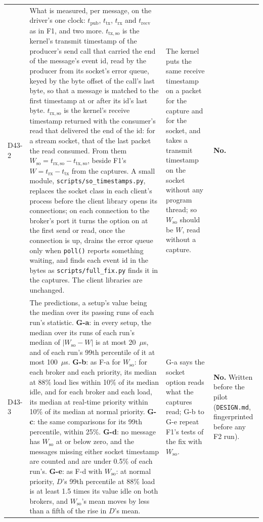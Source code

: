 \documentclass[11pt]{article}
\begin{document}
{\begin{longtable}{@{}p{1.1cm} >{\raggedright\arraybackslash}p{6.1cm} >{\raggedright\arraybackslash}p{6.0cm} >{\raggedright\arraybackslash}p{2.2cm}@{}}
D43-2 & What is measured, per message, on the driver's one clock: $t_{\mathrm{pub}}$, $t_{\mathrm{tx}}$, $t_{\mathrm{rx}}$ and $t_{\mathrm{recv}}$ as in F1, and two more. $t_{\mathrm{tx,so}}$ is the kernel's transmit timestamp of the producer's send call that carried the end of the message's event id, read by the producer from its socket's error queue, keyed by the byte offset of the call's last byte, so that a message is matched to the first timestamp at or after its id's last byte. $t_{\mathrm{rx,so}}$ is the kernel's receive timestamp returned with the consumer's read that delivered the end of the id: for a stream socket, that of the last packet the read consumed. From them $W_{\mathrm{so}} = t_{\mathrm{rx,so}} - t_{\mathrm{tx,so}}$, beside F1's $W = t_{\mathrm{rx}} - t_{\mathrm{tx}}$ from the captures. A small module, \texttt{scripts/so\_timestamps.py}, replaces the socket class in each client's process before the client library opens its connections; on each connection to the broker's port it turns the option on at the first send or read, once the connection is up, drains the error queue only when \texttt{poll()} reports something waiting, and finds each event id in the bytes as \texttt{scripts/full\_fix.py} finds it in the captures. The client libraries are unchanged. & The kernel puts the same receive timestamp on a packet for the capture and for the socket, and takes a transmit timestamp on the socket without any program thread; so $W_{\mathrm{so}}$ should be $W$, read without a capture. & \textbf{No.} \\
D43-3 & The predictions, a setup's value being the median over its passing runs of each run's statistic. \textbf{G-a}: in every setup, the median over its runs of each run's median of $|W_{\mathrm{so}} - W|$ is at most 20~$\mu$s, and of each run's 99th percentile of it at most 100~$\mu$s. \textbf{G-b}: as F-a for $W_{\mathrm{so}}$: for each broker and each priority, its median at 88\% load lies within 10\% of its median idle, and for each broker and each load, its median at real-time priority within 10\% of its median at normal priority. \textbf{G-c}: the same comparisons for its 99th percentile, within 25\%. \textbf{G-d}: no message has $W_{\mathrm{so}}$ at or below zero, and the messages missing either socket timestamp are counted and are under 0.5\% of each run's. \textbf{G-e}: as F-d with $W_{\mathrm{so}}$: at normal priority, $D$'s 99th percentile at 88\% load is at least 1.5 times its value idle on both brokers, and $W_{\mathrm{so}}$'s mean moves by less than a fifth of the rise in $D$'s mean. & G-a says the socket option reads what the captures read; G-b to G-e repeat F1's tests of the fix with $W_{\mathrm{so}}$. & \textbf{No.} Written before the pilot (\texttt{DESIGN.md}, fingerprinted before any F2 run). \\

\end{longtable}}
\end{document}
